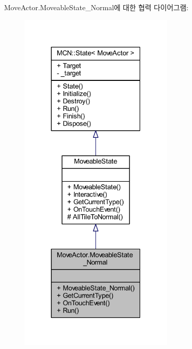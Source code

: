 Move\+Actor.\+Moveable\+State\+\_\+\+Normal에 대한 협력 다이어그램\+:\nopagebreak
\begin{figure}[H]
\begin{center}
\leavevmode
\includegraphics[width=211pt]{class_move_actor_1_1_moveable_state___normal__coll__graph}
\end{center}
\end{figure}
